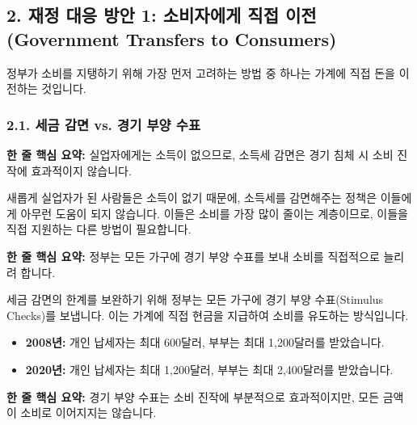 \documentclass[11pt,a4paper]{book}
\theoremstyle{definition}
\begin{document}
\subsection{2. 재정 대응 방안 1: 소비자에게 직접 이전 (Government Transfers to Consumers)}

정부가 소비를 지탱하기 위해 가장 먼저 고려하는 방법 중 하나는 가계에 직접 돈을 이전하는 것입니다.

\subsubsection*{2.1. 세금 감면 vs. 경기 부양 수표}

\begin{tcolorbox}[mybox={세금 감면의 한계}]
    \textbf{한 줄 핵심 요약:} 실업자에게는 소득이 없으므로, 소득세 감면은 경기 침체 시 소비 진작에 효과적이지 않습니다.
\end{tcolorbox}

새롭게 실업자가 된 사람들은 소득이 없기 때문에, 소득세를 감면해주는 정책은 이들에게 아무런 도움이 되지 않습니다. 이들은 소비를 가장 많이 줄이는 계층이므로, 이들을 직접 지원하는 다른 방법이 필요합니다.

\begin{tcolorbox}[mybox={경기 부양 수표의 도입}]
    \textbf{한 줄 핵심 요약:} 정부는 모든 가구에 경기 부양 수표를 보내 소비를 직접적으로 늘리려 합니다.
\end{tcolorbox}

세금 감면의 한계를 보완하기 위해 정부는 모든 가구에 경기 부양 수표(Stimulus Checks)를 보냅니다. 이는 가계에 직접 현금을 지급하여 소비를 유도하는 방식입니다.

\begin{examplebox}[title={예시: 미국 경기 부양 수표 지급 사례}]
    \begin{itemize}
        \item \textbf{2008년:} 개인 납세자는 최대 600달러, 부부는 최대 1,200달러를 받았습니다.
        \item \textbf{2020년:} 개인 납세자는 최대 1,200달러, 부부는 최대 2,400달러를 받았습니다.
    \end{itemize}
\end{examplebox}

\begin{tcolorbox}[mybox={경기 부양 수표의 효과성}]
    \textbf{한 줄 핵심 요약:} 경기 부양 수표는 소비 진작에 부분적으로 효과적이지만, 모든 금액이 소비로 이어지지는 않습니다.
\end{tcolorbox}
\end{document}
